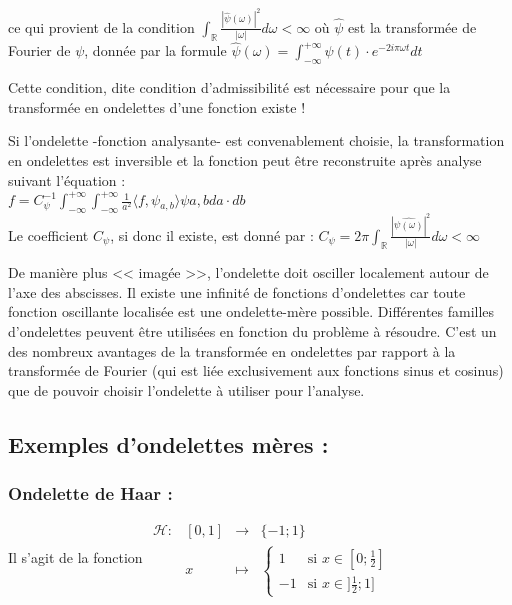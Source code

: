 \documentclass{article}
\begin{document}
ce qui provient de la condition $\int_{\mathbb{R}} \frac{|\hat{\psi}(\omega)|^2}{|\omega|}d\omega < \infty$ où $\hat{\psi}$ est la transformée de Fourier de $\psi$, donnée par la formule $\displaystyle \hat{\psi}(\omega)= \int_{-\infty}^{+\infty}\psi{}(t)\cdot{}e^{-2i\pi\omega{}t}dt$

Cette condition, dite condition d’admissibilité est nécessaire pour que la transformée en ondelettes d’une fonction existe !

Si l'ondelette -fonction analysante- est convenablement choisie, la transformation en ondelettes est inversible et la fonction peut être reconstruite après analyse suivant l'équation : \\

$\displaystyle f = C_{\psi}^{-1}\int_{-\infty}^{+\infty}\int_{-\infty}^{+\infty}\frac{1}{a^2}\langle{}f,\psi{}_{a,b}\rangle\psi{a,b}da\cdot{}db$ \\


Le coefficient $C_{\psi}$, si donc il existe, est donné par : $\displaystyle C_{\psi} = 2\pi\int_{\mathbb{R}}\frac{|\hat{\psi{}(\omega)}|^2}{|\omega|}d\omega < \infty$


De manière plus << imagée >>, l’ondelette doit osciller localement autour de l’axe des abscisses.
Il existe une infinité de fonctions d’ondelettes car toute fonction oscillante localisée est une ondelette-mère possible.
Différentes familles d’ondelettes peuvent être utilisées en fonction du problème à résoudre. C’est un des nombreux avantages de la transformée en ondelettes par rapport à la transformée de Fourier (qui est liée exclusivement aux fonctions sinus et cosinus) que de pouvoir choisir l’ondelette à utiliser pour l’analyse.


\subsection{Exemples d’ondelettes mères :}

\subsubsection{Ondelette de Haar :}

Il s'agit de la fonction $\begin{array}{lrcl}
\mathcal{H} : & [0,1] & \longrightarrow & \{-1;1\} \\
    & x & \longmapsto & \begin{cases}
   1 & \text{si } x \in [0;\frac{1}{2}] \\
   -1       & \text{si } x \in ]\frac{1}{2};1]
  \end{cases} \end{array}$
  
\end{document}
